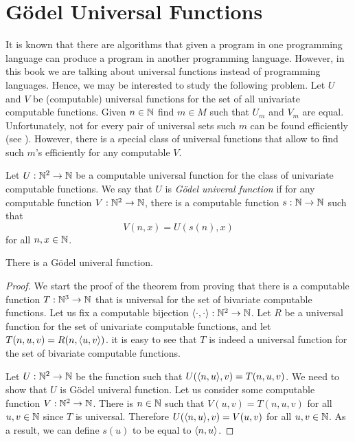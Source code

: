\chapter{G\"odel Universal Functions}
It is known that there are algorithms that given a program in one programming
language can produce a program in another programming language.
However, in this book we are talking about universal functions instead of
programming languages. Hence, we may be interested to study the following
problem. Let $U$ and $V$ be (computable) universal functions for the set of all
univariate computable functions. Given $n \in {\mathbb{N}}$ find $m \in M$ such that $U_m$
and $V_m$ are equal. Unfortunately, not for every pair of universal sets such
$m$ can be found efficiently (see ). 
However, there is a special class of universal functions that allow to find such
$m$'s efficiently for any computable $V$.
\begin{definition}
  Let $U : {\mathbb{N}}^2 \to {\mathbb{N}}$ be a computable universal function for the class of
  univariate computable functions. We say that $U$ is \emph{G\"odel univeral
  function} if for any computable function $V : {\mathbb{N}}^2 \to {\mathbb{N}}$, there is a
  computable function $s : {\mathbb{N}} \to {\mathbb{N}}$ such that 
  \[
    V(n, x) = U(s(n), x)
  \]
  for all $n, x \in {\mathbb{N}}$.
\end{definition}

\begin{theorem}
  There is a G\"odel univeral function.
\end{theorem}

\begin{proof}
  We start the proof of the theorem from proving that there is a computable
  function $T : {\mathbb{N}}^3 \to {\mathbb{N}}$ that is universal for the set of bivariate
  computable functions. Let us fix a computable bijection 
  $\langle {\cdot}, {\cdot} \rangle : {\mathbb{N}}^2 \to {\mathbb{N}}$. Let $R$ be a universal function for the set of
  univariate computable functions, and let $T(n, u, v) = R(n, \langle {u}, {v} \rangle)$.
  it is easy to see that $T$ is indeed a universal function for the set of
  bivariate computable functions.

  Let $U : {\mathbb{N}}^2 \to {\mathbb{N}}$ be the function such that $U(\langle {n}, {u} \rangle, v) = 
  T(n, u, v)$. We need to show that $U$ is G\"odel univeral function.
  Let us consider some computable function $V : {\mathbb{N}}^2 \to {\mathbb{N}}$. There is $n \in
  {\mathbb{N}}$ such that $V(u, v) = T(n, u, v)$ for all $u, v \in {\mathbb{N}}$ since $T$ is
  universal. Therefore $U(\langle {n}, {u} \rangle, v) = V(u, v)$ for all $u, v \in {\mathbb{N}}$.
  As a result, we can define $s(u)$ to be equal to $\langle {n}, {u} \rangle$.
\end{proof}

